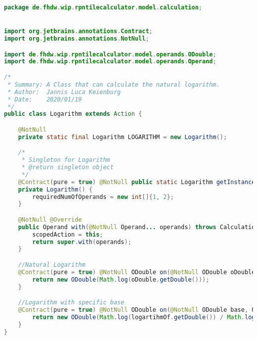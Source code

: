 \begin{lstlisting}[caption=Logarithm (Keienburg),label=list:Logarithm,language=Java]
package de.fhdw.wip.rpntilecalculator.model.calculation;


import org.jetbrains.annotations.Contract;
import org.jetbrains.annotations.NotNull;

import de.fhdw.wip.rpntilecalculator.model.operands.ODouble;
import de.fhdw.wip.rpntilecalculator.model.operands.Operand;

/*
 * Summary: A Class that can calculate the natural logarithm.
 * Author:  Jannis Luca Keienburg
 * Date:    2020/01/19
 */
public class Logarithm extends Action {

    @NotNull
    private static final Logarithm LOGARITHM = new Logarithm();

    /*
     * Singleton for Logarithm
     * @return singleton object
     */
    @Contract(pure = true) @NotNull public static Logarithm getInstance() { return LOGARITHM; }
    private Logarithm() {
        requiredNumOfOperands = new int[]{1, 2};
    }

    @NotNull @Override
    public Operand with(@NotNull Operand... operands) throws CalculationException {
        scopedAction = this;
        return super.with(operands);
    }

    //Natural Logarithm
    @Contract(pure = true) @NotNull ODouble on(@NotNull ODouble oDouble) {
        return new ODouble(Math.log(oDouble.getDouble()));
    }

    //Logarithm with specific base
    @Contract(pure = true) @NotNull ODouble on(@NotNull ODouble base, ODouble logartihmOf) {
        return new ODouble(Math.log(logartihmOf.getDouble()) / Math.log(base.getDouble()));
    }
}
\end{lstlisting}    

